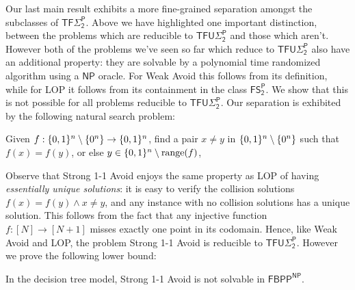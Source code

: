 Our last main result exhibits a more fine-grained separation amongst the subclasses of $\mathsf{TF\Sigma_2^P}$. Above we have highlighted one important distinction, between the problems which are reducible to $\mathsf{TFU\Sigma_2^P}$ and those which aren't. However both of the problems we've seen so far which reduce to $\mathsf{TFU\Sigma_2^P}$ also have an additional property: they are solvable by a polynomial time randomized algorithm using a $\mathsf{NP}$ oracle. For Weak Avoid this follows from its definition, while for LOP it follows from its containment in the class $\mathsf{FS_2^P}$. We show that this is not possible for all problems reducible to $\mathsf{TFU\Sigma_2^P}$. Our separation is exhibited by the following natural search problem: 
\begin{definition}
Given $f: \{0,1\}^n \setminus \{0^n\} \to \{0,1\}^n$, find a pair $x\neq y $ in $\{0,1\}^n \setminus \{0^n\}$ such that $f(x)=f(y)$, or else $y \in \{0,1\}^n \setminus \mathrm{range}(f)$, 
\end{definition}
Observe that Strong 1-1 Avoid enjoys the same property as LOP of having \emph{essentially unique solutions}: it is easy to verify the collision solutions $f(x)=f(y) \land x\neq y$, and any instance with no collision solutions has a unique solution. This follows from the fact that any injective function $f: [N] \to [N+1]$ misses exactly one point in its codomain. Hence, like Weak Avoid and LOP, the problem Strong 1-1 Avoid is reducible to $\mathsf{TFU\Sigma_2^P}$. However we prove the following lower bound:

\begin{theorem}

In the decision tree model, Strong 1-1 Avoid is not solvable in $\mathsf{FBPP^{NP}}$.
\end{theorem}

